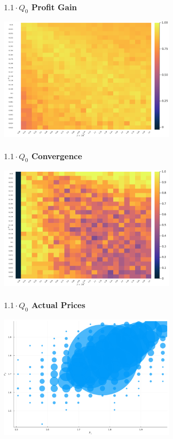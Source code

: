 \documentclass{beamer}
\begin{document}
	\begin{frame}\frametitle{$1.1 \cdot Q_0$ Profit Gain}
\begin{center}
	\includegraphics[width=9cm]{heatmap_profit_gain_small_1.1.png}
\end{center}
\end{frame}
\begin{frame}\frametitle{$1.1 \cdot Q_0$ Convergence}
\begin{center}
	\includegraphics[width=9cm]{heatmap_convergence_counts_small_1.1.png}
\end{center}
\end{frame}
\begin{frame}\frametitle{$1.1 \cdot Q_0$ Actual Prices}
\begin{center}
	\includegraphics[width=9cm]{scatter_plot_prices_small_1.1.png}
\end{center}
\end{frame}
\end{document}
